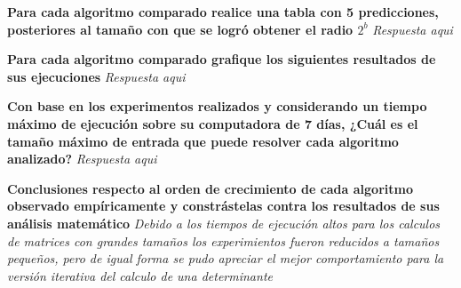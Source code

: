 \documentclass{article}
\begin{document}
\begin{question}
  \textbf{Para cada algoritmo comparado realice una tabla con 5 predicciones, posteriores al tamaño con que se logró obtener el radio $2^{b}$}
  \textit{Respuesta aqui}
\end{question}

\begin{question}
  \textbf{Para cada algoritmo comparado grafique los siguientes resultados de sus ejecuciones}
  \textit{Respuesta aqui}
\end{question}

\begin{question}
  \textbf{Con base en los experimentos realizados y considerando un tiempo máximo de ejecución sobre su computadora de 7 días, ¿Cuál es el tamaño máximo de entrada que puede resolver cada algoritmo analizado?}
  \textit{Respuesta aqui}
\end{question}

\begin{question}
  \textbf{Conclusiones respecto al orden de crecimiento de cada algoritmo observado empíricamente y constrástelas contra los resultados de sus análisis matemático}
  \textit{Debido a los tiempos de ejecución altos para los calculos de matrices con grandes tamaños los experimientos fueron reducidos a tamaños pequeños, pero de igual forma se pudo apreciar el mejor comportamiento para la versión iterativa del calculo de una determinante}
\end{question}
\end{document}
